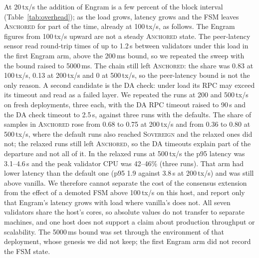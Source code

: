 \begin{table}[tbp]
\caption{Load sensitivity under open-loop offered load, seven validators on one host (60\,s per repeat,
five repeats; mean $\pm$ 95\% Student-$t$ interval). The \textsc{Anchored}
share is the fraction of two-second samples of one validator's FSM state spent
in \textsc{Anchored} and was recorded for the third arm only.}
\label{tab:throughput}
\centering
\footnotesize
\resizebox{\linewidth}{!}{}
\end{table}

At 20\,tx/s the addition of Engram is a few percent of the block
interval (Table~\ref{tab:overhead}); as the load grows, latency grows and the FSM
leaves \textsc{Anchored} for part of the time, already at 100\,tx/s, as follows. The
Engram figures from 100\,tx/s upward are not a steady \textsc{Anchored}
state. The peer-latency sensor read round-trip times of up to 1.2\,s between
validators under this load in the first Engram arm, above the 200\,ms bound, so we repeated the sweep
with the bound raised to 5000\,ms. The chain still left \textsc{Anchored}:
the share was 0.83 at 100\,tx/s, 0.13 at 200\,tx/s and 0 at 500\,tx/s, so the
peer-latency bound is not the only reason. A second candidate is the DA
check: under load its RPC may exceed its timeout and read as a failed layer. We
repeated the runs at 200 and 500\,tx/s on fresh deployments, three each, with the
DA RPC timeout raised to 90\,s and the DA check timeout to 2.5\,s, against three
runs with the defaults. The share of samples in \textsc{Anchored} rose from 0.68 to
0.75 at 200\,tx/s and from 0.36 to 0.80 at 500\,tx/s, where the default runs also
reached \textsc{Sovereign} and the relaxed ones did not; the relaxed runs still
left \textsc{Anchored}, so the DA timeouts explain part of the departure and not
all of it. In the relaxed runs at 500\,tx/s the p95 latency was 3.1--4.6\,s and the
peak validator CPU was 42--46\% (three runs).
That arm had lower latency than the default one (p95 1.9 against 3.8\,s at
200\,tx/s) and was still above vanilla. We therefore cannot separate the cost of
the consensus extension from the effect of a demoted FSM above 100\,tx/s on
this host, and report only that Engram's latency grows with load where
vanilla's does not. All seven validators share the host's cores, so absolute
values do not transfer to separate machines, and one host does not support a
claim about production throughput or scalability. The 5000\,ms bound was set
through the environment of that deployment, whose genesis we did not keep; the
first Engram arm did not record the FSM state.



